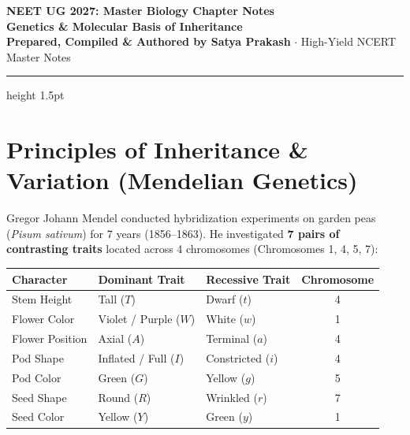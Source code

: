 \documentclass[10pt,a4paper]{article}
\begin{document}
\begin{center}
  {\Huge \textbf{NEET UG 2027: Master Biology Chapter Notes}}\\[6pt]
  {\Large \textbf{Genetics \& Molecular Basis of Inheritance}}\\[4pt]
  {\small \textbf{Prepared, Compiled \& Authored by Satya Prakash} $\cdot$ High-Yield NCERT Master Notes}
  \vspace{4pt}
  \hrule height 1.5pt
\end{center}

\pagestyle{fancy}
\fancyhf{}
\fancyfoot[C]{\thepage}

\section{Principles of Inheritance \& Variation (Mendelian Genetics)}

\begin{conceptbox}
Gregor Johann Mendel conducted hybridization experiments on garden peas (\textit{Pisum sativum}) for 7 years (1856--1863). He investigated \textbf{7 pairs of contrasting traits} located across 4 chromosomes (Chromosomes 1, 4, 5, 7):
\begin{center}
\small
\begin{tabular}{|l|l|l|c|}
\hline
\textbf{Character} & \textbf{Dominant Trait} & \textbf{Recessive Trait} & \textbf{Chromosome} \\
\hline
Stem Height & Tall ($T$) & Dwarf ($t$) & 4 \\
Flower Color & Violet / Purple ($W$) & White ($w$) & 1 \\
Flower Position & Axial ($A$) & Terminal ($a$) & 4 \\
Pod Shape & Inflated / Full ($I$) & Constricted ($i$) & 4 \\
Pod Color & Green ($G$) & Yellow ($g$) & 5 \\
Seed Shape & Round ($R$) & Wrinkled ($r$) & 7 \\
Seed Color & Yellow ($Y$) & Green ($y$) & 1 \\
\hline
\end{tabular}
\end{center}
\end{conceptbox}
\end{document}
